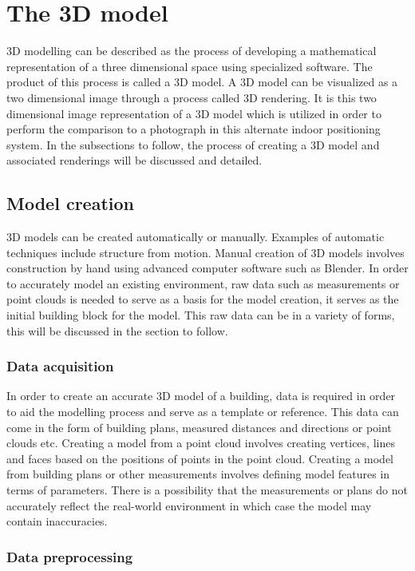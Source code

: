\documentclass[11pt,a4paper]{report}
\begin{document}
	\newpage
	\section{The 3D model}
		3D modelling can be described as the process of developing a mathematical representation of a three dimensional space using specialized software. The product of this process is called a 3D model. A 3D model can be visualized as a two dimensional image through a process called 3D rendering. It is this two dimensional image representation of a 3D model which is utilized in order to perform the comparison to a photograph in this alternate indoor positioning system. In the subsections to follow, the process of creating a 3D model and associated renderings will be discussed and detailed.
		
		\subsection{Model creation}
			3D models can be created automatically or manually. Examples of automatic techniques include structure from motion. Manual creation of 3D models involves construction by hand using advanced computer software such as Blender. In order to accurately model an existing environment, raw data such as measurements or point clouds is needed to serve as a basis for the model creation, it serves as the initial building block for the model. This raw data can be in a variety of forms, this will be discussed in the section to follow.
		
			\subsubsection{Data acquisition}
				In order to create an accurate 3D model of a building, data is required in order to aid the modelling process and serve as a template or reference. This data can come in the form of building plans, measured distances and directions or point clouds etc.
				Creating a model from a point cloud involves creating vertices, lines and faces based on the positions of points in the point cloud.
				Creating a model from building plans or other measurements involves defining model features in terms of parameters. There is a possibility that the measurements or plans do not accurately reflect the real-world environment in which case the model may contain inaccuracies. 
				
			\subsubsection{Data preprocessing}
\end{document}
